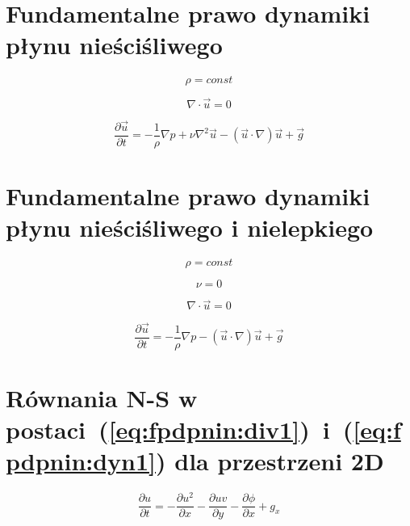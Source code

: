 \documentclass[a4paper,10pt]{article}
\begin{document}
  \section{Fundamentalne prawo dynamiki płynu nieściśliwego}

	\begin{equation}
		\rho=const
	\end{equation}

	\begin{equation}
		\nabla\cdot\vec{u} = 0
	\end{equation}

	\begin{equation}
		\frac{\partial\vec{u}}{\partial t} = -\frac{1}{\rho}\nabla p + \nu\nabla^2\vec{u}-\left(\vec{u}\cdot\nabla\right)\vec{u} + \vec{g}
	\end{equation}

  \section{Fundamentalne prawo dynamiki płynu nieściśliwego i nielepkiego}
	\label{sec:fpdpnin}

	\begin{equation}
		\rho=const
	\end{equation}

	\begin{equation}
		\nu=0
	\end{equation}

	\begin{equation}
		\label{eq:fpdpnin:div1}
		\nabla\cdot\vec{u} = 0
	\end{equation}

	\begin{equation}
		\label{eq:fpdpnin:dyn1}
		\frac{\partial\vec{u}}{\partial t} = -\frac{1}{\rho}\nabla p -\left(\vec{u}\cdot\nabla\right)\vec{u} + \vec{g}
	\end{equation}

  \section{Równania N-S w postaci~(\ref{eq:fpdpnin:div1})~i~(\ref{eq:fpdpnin:dyn1}) dla przestrzeni 2D}

	\begin{equation}
		\label{eq:rns2du1}
		\frac{\partial u}{\partial t} = -\frac{\partial u^2}{\partial x} - \frac{\partial uv}{\partial y} - \frac{\partial \phi}{\partial x} + g_x 
	\end{equation}
\end{document}
